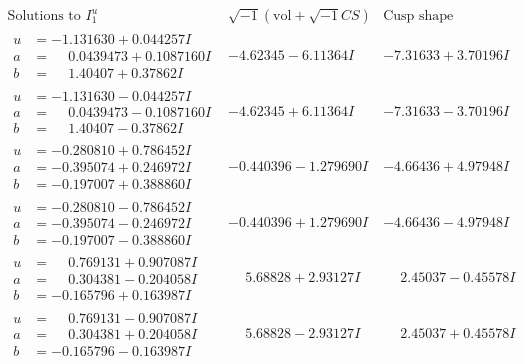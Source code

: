 \documentclass[1p]{elsarticle_modified}
\theoremstyle{definition}
\newcommand{\I}{\sqrt{-1}}
\begin{document}
$$\begin{array}{c|c|c}  
\text{Solutions to }I^u_{1}& \I (\text{vol} + \sqrt{-1}CS) & \text{Cusp shape}\\
 \hline 
\begin{aligned}
u &= -1.131630 + 0.044257 I \\
a &= \phantom{-}0.0439473 + 0.1087160 I \\
b &= \phantom{-}1.40407 + 0.37862 I\end{aligned}
 & -4.62345 - 6.11364 I & -7.31633 + 3.70196 I \\ \hline\begin{aligned}
u &= -1.131630 - 0.044257 I \\
a &= \phantom{-}0.0439473 - 0.1087160 I \\
b &= \phantom{-}1.40407 - 0.37862 I\end{aligned}
 & -4.62345 + 6.11364 I & -7.31633 - 3.70196 I \\ \hline\begin{aligned}
u &= -0.280810 + 0.786452 I \\
a &= -0.395074 + 0.246972 I \\
b &= -0.197007 + 0.388860 I\end{aligned}
 & -0.440396 - 1.279690 I & -4.66436 + 4.97948 I \\ \hline\begin{aligned}
u &= -0.280810 - 0.786452 I \\
a &= -0.395074 - 0.246972 I \\
b &= -0.197007 - 0.388860 I\end{aligned}
 & -0.440396 + 1.279690 I & -4.66436 - 4.97948 I \\ \hline\begin{aligned}
u &= \phantom{-}0.769131 + 0.907087 I \\
a &= \phantom{-}0.304381 - 0.204058 I \\
b &= -0.165796 + 0.163987 I\end{aligned}
 & \phantom{-}5.68828 + 2.93127 I & \phantom{-}2.45037 - 0.45578 I \\ \hline\begin{aligned}
u &= \phantom{-}0.769131 - 0.907087 I \\
a &= \phantom{-}0.304381 + 0.204058 I \\
b &= -0.165796 - 0.163987 I\end{aligned}
 & \phantom{-}5.68828 - 2.93127 I & \phantom{-}2.45037 + 0.45578 I \\ \hline\begin{aligned}

\end{aligned}
\end{array}$$
\end{document}

